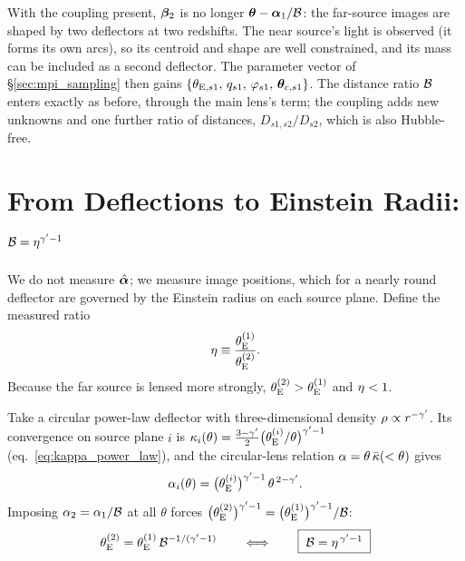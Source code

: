 \begin{annotation}
With the coupling present, $\boldsymbol{\beta}_2$ is no longer
$\boldsymbol{\theta}-\boldsymbol{\alpha}_1/\mathcal{B}$: the far-source images are shaped by two
deflectors at two redshifts.  The near source's light is observed (it
forms its own arcs), so its centroid and shape are well constrained, and
its mass can be included as a second deflector.  The parameter vector of
\S\ref{sec:mpi_sampling} then gains
$\{\theta_{\mathrm{E},s1},\,q_{s1},\,\varphi_{s1},\,\boldsymbol{\theta}_{c,s1}\}$.
The distance ratio $\mathcal{B}$ enters exactly as before, through the main
lens's term; the coupling adds new unknowns and one further ratio of
distances, $D_{s1,s2}/D_{s2}$, which is also Hubble-free.
\end{annotation}


\section{From Deflections to Einstein Radii: $\mathcal{B}=\eta^{\gamma'-1}$}
\label{sec:mp_eta}

We do not measure $\hat{\boldsymbol{\alpha}}$; we measure image positions, which
for a nearly round deflector are governed by the Einstein radius on each
source plane.  Define the measured ratio
\begin{equation}
    \eta\equiv\frac{\theta_{\mathrm{E}}^{(1)}}{\theta_{\mathrm{E}}^{(2)}} .
    \label{eq:mp_eta}
\end{equation}
Because the far source is lensed more strongly,
$\theta_{\mathrm{E}}^{(2)}>\theta_{\mathrm{E}}^{(1)}$ and $\eta<1$.

Take a circular power-law deflector with three-dimensional density
$\rho\propto r^{-\gamma'}$.  Its convergence on source plane $i$ is
$\kappa_i(\theta)=\frac{3-\gamma'}{2}\big(\theta_{\mathrm{E}}^{(i)}/\theta\big)^{\gamma'-1}$
(eq.~\eqref{eq:kappa_power_law}), and the circular-lens relation
$\alpha=\theta\,\bar{\kappa}(<\theta)$ gives
\begin{equation}
  \alpha_i(\theta)=\big(\theta_{\mathrm{E}}^{(i)}\big)^{\gamma'-1}\,\theta^{\,2-\gamma'}.
  \label{eq:mp_plaw}
\end{equation}
  Imposing $\alpha_2=\alpha_1/\mathcal{B}$ at all $\theta$
forces $\big(\theta_{\mathrm{E}}^{(2)}\big)^{\gamma'-1}=\big(\theta_{\mathrm{E}}^{(1)}\big)^{\gamma'-1}/\mathcal{B}$:
\begin{equation}
  \theta_{\mathrm{E}}^{(2)} = \theta_{\mathrm{E}}^{(1)}\,\mathcal{B}^{-1/(\gamma'-1)}
  \qquad\Longleftrightarrow\qquad
  \boxed{\;\mathcal{B} = \eta^{\,\gamma'-1}\;}
  \label{eq:mp_etaB}
\end{equation}

